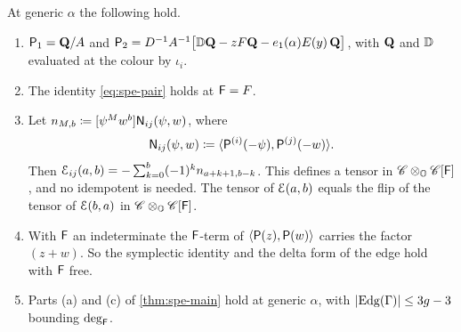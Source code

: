 \begin{lem}
\label{lem:spe-pair}
At generic $\alpha$ the following hold.
\begin{enumerate}
\item $\mathsf{P}_1=\mathbf{Q}/A$ and $\mathsf{P}_2=D^{-1}A^{-1}\big[\mathbb{D}\mathbf{Q}-zF\mathbf{Q}-e_1(\alpha)E(y)\,\mathbf{Q}\big]$, with $\mathbf{Q}$ and $\mathbb{D}$ evaluated at the colour by $\iota_i$.
\item The identity \eqref{eq:spe-pair} holds at $\mathsf{F}=F$.
\item Let $n_{M,b}\coloneqq[\psi^Mw^b]\mathsf{N}_{ij}(\psi,w)$, where
\[
\mathsf{N}_{ij}(\psi,w)\coloneqq\langle\mathsf{P}^{(i)}(-\psi),\mathsf{P}^{(j)}(-w)\rangle.
\]
Then $\mathcal{E}_{ij}(a,b)=-\sum_{k=0}^{b}(-1)^kn_{a+k+1,b-k}$. This defines a tensor in $\mathscr{C}\otimes_{\mathbb{O}}\mathscr{C}[\mathsf{F}]$, and no idempotent is needed. The tensor of $\mathcal{E}(a,b)$ equals the flip of the tensor of $\mathcal{E}(b,a)$ in $\mathscr{C}\otimes_{\mathbb{O}}\mathscr{C}[\mathsf{F}]$.
\item With $\mathsf{F}$ an indeterminate the $\mathsf{F}$-term of $\langle\mathsf{P}(z),\mathsf{P}(w)\rangle$ carries the factor $(z+w)$. So the symplectic identity and the delta form of the edge hold with $\mathsf{F}$ free.
\item Parts \textup{(a)} and \textup{(c)} of \cref{thm:spe-main} hold at generic $\alpha$, with $|\mathrm{Edg}(\Gamma)|\leq3g-3$ bounding $\deg_{\mathsf{F}}$.
\end{enumerate}
\end{lem}

